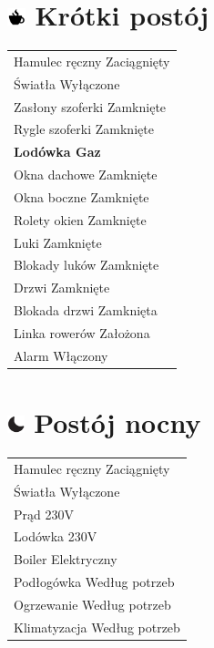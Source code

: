 \documentclass{article}
\begin{document}
\begin{multicols}{2}
\section*{\includegraphics[height=5mm]{break.png} Krótki postój}
\begin{tabularx}{\columnwidth}{|X|}
\hline
Hamulec ręczny \dotfill Zaciągnięty \\
Światła \dotfill Wyłączone \\
Zasłony szoferki \dotfill Zamknięte \\
Rygle szoferki \dotfill Zamknięte \\
\textbf{Lodówka \dotfill Gaz} \\
Okna dachowe \dotfill Zamknięte \\
Okna boczne \dotfill Zamknięte \\
Rolety okien \dotfill Zamknięte \\
Luki \dotfill Zamknięte \\
Blokady luków \dotfill Zamknięte \\
Drzwi \dotfill Zamknięte \\
Blokada drzwi \dotfill Zamknięta \\
Linka rowerów \dotfill Założona \\
Alarm \dotfill Włączony \\
\hline
\end{tabularx}

\section*{\includegraphics[height=5mm]{night.png} Postój nocny}
\begin{tabularx}{\columnwidth}{|X|}
\hline
Hamulec ręczny \dotfill Zaciągnięty \\
Światła \dotfill Wyłączone \\
Prąd \dotfill 230V \\
Lodówka \dotfill 230V \\
Boiler \dotfill Elektryczny \\
Podłogówka \dotfill Według potrzeb \\
Ogrzewanie \dotfill Według potrzeb \\
Klimatyzacja \dotfill Według potrzeb \\
\hline
\end{tabularx}


\end{multicols}
\end{document}
